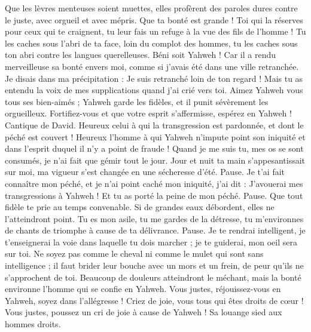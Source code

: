 \begin{multicols}{2}
Que les lèvres menteuses soient muettes, elles profèrent des paroles dures contre le juste, avec orgueil et avec mépris.
Que ta bonté est grande ! Toi qui la réserves pour ceux qui te craignent, tu leur fais un refuge à la vue des fils de l’homme !
Tu les caches sous l’abri de ta face, loin du complot des hommes, tu les caches sous ton abri contre les langues querelleuses.
Béni soit Yahweh ! Car il a rendu merveilleuse sa bonté envers moi, comme si j’avais été dans une ville retranchée.
Je disais dans ma précipitation : Je suis retranché loin de ton regard ! Mais tu as entendu la voix de mes supplications quand j'ai crié vers toi.
Aimez Yahweh vous tous ses bien-aimés ; Yahweh garde les fidèles, et il punit sévèrement les orgueilleux.
Fortifiez-vous et que votre esprit s’affermisse, espérez en Yahweh !
\VerseOne{}Cantique de David. Heureux celui à qui la transgression est pardonnée, et dont le péché est couvert !
Heureux l'homme à qui Yahweh n'impute point son iniquité et dans l'esprit duquel il n'y a point de fraude !
Quand je me suis tu, mes os se sont consumés, je n'ai fait que gémir tout le jour.
Jour et nuit ta main s'appesantissait sur moi, ma vigueur s'est changée en une sécheresse d'été. Pause.
Je t'ai fait connaître mon péché, et je n'ai point caché mon iniquité, j'ai dit : J’avouerai mes transgressions à Yahweh ! Et tu as porté la peine de mon péché. Pause.
Que tout fidèle te prie au temps convenable. Si de grandes eaux débordent, elles ne l'atteindront point.
Tu es mon asile, tu me gardes de la détresse, tu m'environnes de chants de triomphe à cause de ta délivrance. Pause.
Je te rendrai intelligent, je t'enseignerai la voie dans laquelle tu dois marcher ; je te guiderai, mon oeil sera sur toi.
Ne soyez pas comme le cheval ni comme le mulet qui sont sans intelligence ; il faut brider leur bouche avec un mors et un frein, de peur qu'ils ne s’approchent de toi.
Beaucoup de douleurs atteindront le méchant, mais la bonté environne l'homme qui se confie en Yahweh.
Vous justes, réjouissez-vous en Yahweh, soyez dans l’allégresse ! Criez de joie, vous tous qui êtes droits de cœur !
\VerseOne{}Vous justes, poussez un cri de joie à cause de Yahweh ! Sa louange sied aux hommes droits.

\end{multicols}
